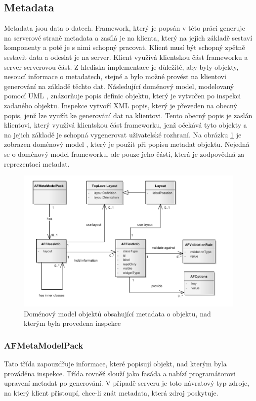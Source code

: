 \subsection{Metadata}
Metadata \cite{metadata} jsou data o datech. Framework, který je popsán v této práci generuje na serverové straně metadata a zasílá je na klienta, který na jejich základě sestaví komponenty a poté je s nimi schopný pracovat. Klient musí být schopný zpětně sestavit data a odeslat je na server. Klient využívá klientskou část frameworku a server serverovou část. Z hlediska implementace je důležité, aby byly objekty, nesoucí informace o metadatech, stejné a bylo možné provést na klientovi generování na základě těchto dat.
Následující doménový model, modelovaný pomocí UML \cite{UmlArlow}, znázorňuje popis definic objektu, který je vytvořen po inspekci zadaného objektu. Inspekce vytvoří XML popis, který je převeden na obecný popis, jenž lze využít ke generování dat na klientovi. Tento obecný popis je zaslán klientovi, který využívá klientskou část frameworku, jenž očekává tyto objekty a na jejich základě je schopná vygenerovat uživatelské rozhraní. Na obrázku \ref{img:metadataModel} je zobrazen doménový model \cite{UmlArlow}, který je použit při popisu metadat objektu. Nejedná se o doménový model frameworku, ale pouze jeho části, která je zodpovědná za reprezentaci metadat. 

\begin{figure}[h!]
\includegraphics{images/domainModel}
\caption{Doménový model objektů obsahující metadata o objektu, nad kterým byla provedena inspekce}
\label{img:metadataModel}
\end{figure}

\subsubsection{AFMetaModelPack}
Tato třída zapouzdřuje informace, které popisují objekt, nad kterým byla prováděna inspekce. Třída rovněž slouží jako fasáda a nabízí programátorovi upravení metadat po generování. V případě serveru je toto návratový typ zdroje, na který klient přistoupí, chce-li znát metadata, která zdroj poskytuje.
